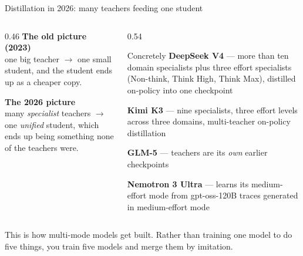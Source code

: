 \documentclass[aspectratio=169,10pt]{beamer}
\begin{document}
\begin{frame}{Distillation in 2026: many teachers feeding one student}
  \begin{columns}[T]
    \begin{column}{0.46\textwidth}
      \textbf{The old picture (2023)}\\
      one big teacher $\rightarrow$ one small student, and the student ends up
      as a cheaper copy.
      \vspace{0.8em}

      \textbf{The 2026 picture}\\
      many \emph{specialist} teachers $\rightarrow$ one \emph{unified} student,
      which ends up being something none of the teachers were.
    \end{column}
    \begin{column}{0.54\textwidth}
      \begin{block}{Concretely}
        \small
        \textbf{DeepSeek V4} --- more than ten domain specialists plus three
        effort specialists (Non-think, Think High, Think Max), distilled
        on-policy into one checkpoint

        \textbf{Kimi K3} --- nine specialists, three effort levels across three
        domains, multi-teacher on-policy distillation

        \textbf{GLM-5} --- teachers are its \emph{own} earlier checkpoints

        \textbf{Nemotron 3 Ultra} --- learns its medium-effort mode from
        gpt-oss-120B traces generated in medium-effort mode
      \end{block}
    \end{column}
  \end{columns}
  \vspace{0.4em}
  \raggedright
  \small
  This is how multi-mode models get built. Rather than training one model to do
  five things, you train five models and merge them by imitation.
\end{frame}
\end{document}

